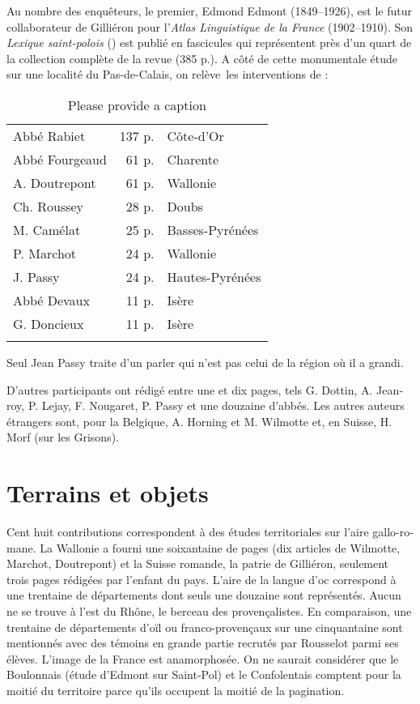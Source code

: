 \documentclass[french,output=paper,colorlinks,citecolor=brown]{../langscibook}
\begin{document}
\begin{otherlanguage}{french}
Au nombre des enquêteurs, le premier, Edmond Edmont (1849--1926), est le futur collaborateur de Gilliéron pour l’\textit{Atlas Linguistique de la France} (1902--1910). Son \textit{Lexique saint-polois} (\citeyear{Edmont1887, Edmont1897}) est publié en fascicules qui représentent près d’un quart de la collection complète de la revue (385 p.). A côté de cette monumentale étude sur une localité du Pas-de-Calais, on relève~les interventions de :

\begin{table}
\begin{tabular}{lrl}
\lsptoprule
Abbé Rabiet  &   137 p.   &  Côte-d’Or \\
Abbé Fourgeaud  &   61 p.  &  Charente \\
  A. Doutrepont  &     61 p.  &  Wallonie \\
  Ch. Roussey   &   28 p.  &  Doubs \\
  M. Camélat  &    25 p.  &  Basses-Pyrénées \\
  P. Marchot  &    24 p.  &  Wallonie \\
  J. Passy    &  24 p.  &  Hautes-Pyrénées \\
  Abbé Devaux    &   11 p.  &  Isère  \\
  G. Doncieux   &   11 p.  &  Isère \\
  \lspbottomrule
 \end{tabular} 
 \caption{\color{red}Please provide a caption}
 \end{table}
 
Seul Jean Passy traite d’un parler qui n’est pas celui de la région où il a grandi.

D’autres participants ont rédigé entre une et dix pages, tels G. Dottin, A. Jeanroy, P. Lejay, F. Nougaret, P. Passy et une douzaine d’abbés. Les autres auteurs étrangers sont, pour la Belgique, A. Horning et M. Wilmotte et, en Suisse, H. Morf (sur les Grisons).

\section{Terrains et objets}

Cent huit contributions correspondent à des études territoriales sur l’aire gallo-romane. La Wallonie a fourni une soixantaine de pages (dix articles de Wilmotte, Marchot, Doutrepont) et la Suisse romande, la patrie de Gilliéron, seulement trois pages rédigées par l’enfant du pays. L’aire de la langue d’oc correspond à une trentaine de départements dont seuls une douzaine sont représentés. Aucun ne se trouve à l’est du Rhône, le berceau des provençalistes. En comparaison, une trentaine de départements d’oïl ou franco-provençaux sur une cinquantaine sont mentionnés avec des témoins en grande partie recrutés par Rousselot parmi ses élèves. L’image de la France est anamorphosée. On ne saurait considérer que le Boulonnais (étude d’Edmont sur Saint-Pol) et le Confolentais comptent pour la moitié du territoire parce qu’ils occupent la moitié de la pagination. 


\end{otherlanguage}
\end{document}
